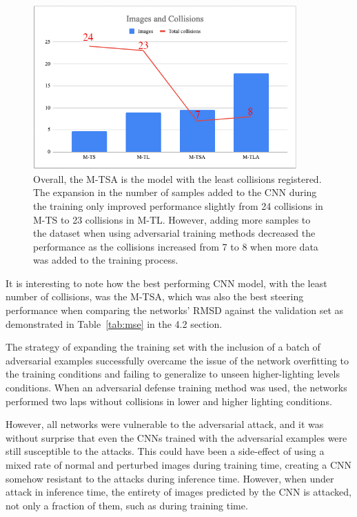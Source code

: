 \documentclass[12pt]{article}
\begin{document}
\begin{figure}[H]
\begin{center}
\includegraphics[width=0.9\textwidth]{figures/images-vs-collisions.png}
\caption{Overall, the M-TSA is the model with the least collisions registered. The expansion in the number of samples added to the CNN during the training only improved performance slightly from 24 collisions in M-TS to 23 collisions in M-TL. However, adding more samples to the dataset when using adversarial training methods decreased the performance as the collisions increased from 7 to 8 when more data was added to the training process.}
\label{fig:imagevscollisions}
\end{center}
\end{figure}

It is interesting to note how the best performing CNN model, with the least number of collisions, was the M-TSA, which was also the best steering performance when comparing the networks' RMSD against the validation set as demonstrated in Table~\ref{tab:mse} in the 4.2 section. 

The strategy of expanding the training set with the inclusion of a batch of adversarial examples successfully overcame the issue of the network overfitting to the training conditions and failing to generalize to unseen higher-lighting levels conditions. When an adversarial defense training method was used, the networks performed two laps without collisions in lower and higher lighting conditions. 

However, all networks were vulnerable to the adversarial attack, and it was without surprise that even the CNNs trained with the adversarial examples were still susceptible to the attacks. This could have been a side-effect of using a mixed rate of normal and perturbed images during training time, creating a CNN somehow resistant to the attacks during inference time. However, when under attack in inference time, the entirety of images predicted by the CNN is attacked, not only a fraction of them, such as during training time.
\end{document}
